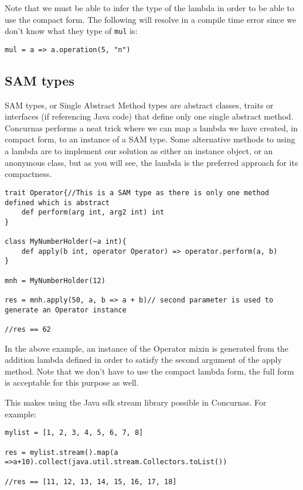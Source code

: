 \documentclass[conc-doc]{subfiles}
\begin{document}
Note that we must be able to infer the type of the lambda in order to be able to use the compact form. The following will resolve in a compile time error since we don't know what they type of \lstinline{mul} is:
\begin{lstlisting}
mul = a => a.operation(5, "n")
\end{lstlisting}

\subsection{SAM types}
SAM types, or Single Abstract Method types are abstract classes, traits or interfaces (if referencing Java code) that define only one single abstract method. Concurnas performs a neat trick where we can map a lambda we have created, in compact form, to an instance of a SAM type. Some alternative methods to using a lambda are to implement our solution as either an instance object, or an anonymous class, but as you will see, the lambda is the preferred approach for its compactness.

\begin{lstlisting}
trait Operator{//This is a SAM type as there is only one method defined which is abstract 
	def perform(arg int, arg2 int) int
}

class MyNumberHolder(~a int){
	def apply(b int, operator Operator) => operator.perform(a, b)
}

mnh = MyNumberHolder(12)

res = mnh.apply(50, a, b => a + b)// second parameter is used to generate an Operator instance

//res == 62
\end{lstlisting}

In the above example, an instance of the Operator mixin is generated from the addition lambda defined in order to satisfy the second argument of the apply method. Note that we don't have to use the compact lambda form, the full form is acceptable for this purpose as well.

This makes using the Java sdk stream library possible in Concurnas. For example:

\begin{lstlisting}
mylist = [1, 2, 3, 4, 5, 6, 7, 8]

res = mylist.stream().map(a =>a+10).collect(java.util.stream.Collectors.toList())

//res == [11, 12, 13, 14, 15, 16, 17, 18]
\end{lstlisting}
\end{document}
